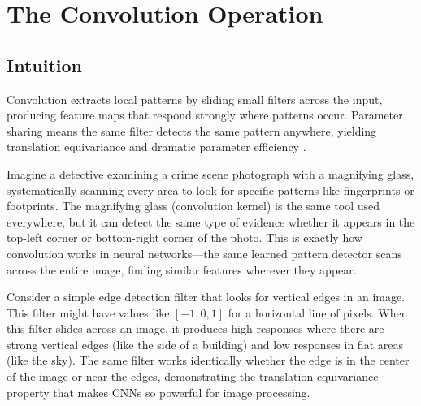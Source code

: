 
\section{The Convolution Operation}
\label{sec:convolution}


\subsection*{Intuition}
Convolution extracts local patterns by sliding small filters across the input, producing feature maps that respond strongly where patterns occur. Parameter sharing means the same filter detects the same pattern anywhere, yielding translation equivariance  and dramatic parameter efficiency \cite{GoodfellowEtAl2016,Prince2023}.

\begin{example}
Imagine a detective examining a crime scene photograph with a magnifying glass, systematically scanning every area to look for specific patterns like fingerprints or footprints. The magnifying glass (convolution kernel) is the same tool used everywhere, but it can detect the same type of evidence whether it appears in the top-left corner or bottom-right corner of the photo. This is exactly how convolution works in neural networks—the same learned pattern detector scans across the entire image, finding similar features wherever they appear.
\end{example}

\begin{example}
Consider a simple edge detection filter that looks for vertical edges in an image. This filter might have values like $[-1, 0, 1]$ for a horizontal line of pixels. When this filter slides across an image, it produces high responses where there are strong vertical edges (like the side of a building) and low responses in flat areas (like the sky). The same filter works identically whether the edge is in the center of the image or near the edges, demonstrating the translation equivariance property that makes CNNs so powerful for image processing.
\end{example}

